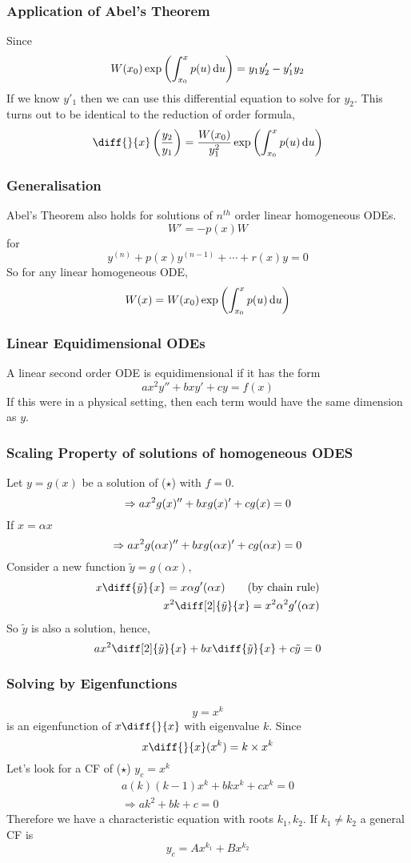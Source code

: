 \documentclass{article}
\begin{document}
\subsubsection*{Application of Abel's Theorem}
Since
\[
    W(x_0) \exp \left( \int_{x_0}^{x}{p(u) \mathop{}\!\mathrm{d} u} \right) = y_1 y_2' - y'_1 y_2
\]
If we know $y'_1$ then we can use this differential equation to solve for $y_2$.
This turns out to be identical to the reduction of order formula,
\[
    \diff {}{x} \bkt{\frac{y_2}{y_1}} = \frac{W(x_0)}{y_1^2} \exp \bkt{\int_{x_0}^{x}{p(u) \diffd u}} 
\]
\subsubsection*{Generalisation}
Abel's Theorem also holds for solutions of $n^{th}$ order linear homogeneous ODEs.
\[
    W' = -p(x)W 
\]
for
\[
    y^{(n)} + p(x) y^{(n-1)} + \cdots + r(x) y = 0
\]
So for any linear homogeneous ODE,
\[
    W(x) = W(x_0) \exp \left( \int_{x_0}^{x}{p(u) \mathop{}\!\mathrm{d} u} \right)
\]
\subsubsection{Linear Equidimensional ODEs}
\begin{defi}
    A linear second order ODE is equidimensional if it has the form 
    \[
        a x^2 y'' + bx y' + cy = f(x) \tag{$\star$}  
    \]
    If this were in a physical setting, then each term would have the same dimension as $y$.
\end{defi}
\subsubsection*{Scaling Property of solutions of homogeneous ODES}
Let $y = g(x)$ be a solution of ($\star$) with $f = 0$.
\[
    \Rightarrow  a x^2 g(x)'' + bx g(x)' + cg(x) = 0 \\
\]
If $x = \alpha x$
\[
    \Rightarrow  a x^2 g(\alpha x)'' + bx g(\alpha x)' + cg(\alpha x) = 0 \\
\]
Consider a new function $\tilde{y} = g(\alpha x)$,
\begin{align*}
    x \diff {\tilde{y}}{x} = x \alpha g'(\alpha x) \tag{by chain rule}\\
    x^2 \diff[2] {\tilde{y}}{x} = x^2 \alpha^2 g'(\alpha x)
\end{align*}
So $\tilde{y}$ is also a solution, hence,
\[
    a x^2 \diff[2]{\tilde{y}}{x} + bx \diff{\tilde{y}}{x} + c\tilde{y} = 0
\]
\subsubsection*{Solving by Eigenfunctions}
\[
    y = x^k  
\]
is an eigenfunction of $x \diff{}{x}$ with eigenvalue $k$. Since
\[
    x \diff{}{x}(x^k) = k \times x^k
\]
Let's look for a CF of ($\star$) $y_c = x^k$
\begin{align*}
    a (k)(k-1) x^k + b k x^k +  c x^k = 0 \\
    \Rightarrow ak^2 + bk + c = 0
\end{align*}
Therefore we have a characteristic equation with roots $k_1, k_2$.
If $k_1 \neq k_2$ a general CF is
\[
    y_c = A x^{k_1} + B x^{k_2}
\]
\end{document}

